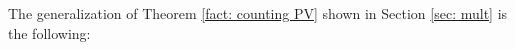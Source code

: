\documentclass{amsart}
\theoremstyle{definition}
\theoremstyle{remark}
\numberwithin{equation}{section}
\def \eq {\operatorname{eq}}
\def \tp {tp}
\def \defin {\operatorname{def}}
\def \HH {\operatorname{H}}
\def \diff {\operatorname{diff}}
\def \alg {\operatorname{alg}}
\def \dcl {\operatorname{dcl}}
\begin{document}





The generalization of Theorem \ref{fact: counting PV} shown in Section \ref{sec: mult} is the following:
\end{document}
